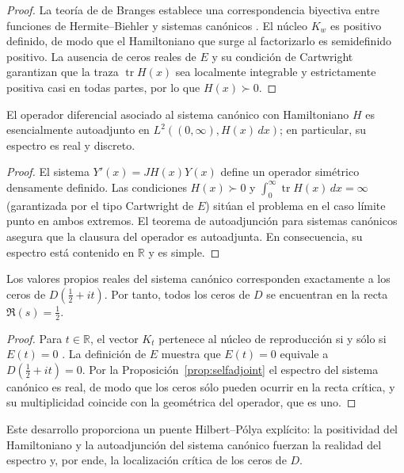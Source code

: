 \begin{proof}
La teoría de de Branges establece una correspondencia biyectiva entre funciones
de Hermite--Biehler y sistemas canónicos
\cite[Thm.~16]{deBranges1986}.  El núcleo $K_w$ es positivo definido, de modo que
el Hamiltoniano que surge al factorizarlo es semidefinido positivo.  La ausencia
de ceros reales de $E$ y su condición de Cartwright garantizan que la traza
$\operatorname{tr} H(x)$ sea localmente integrable y estrictamente positiva casi
en todas partes, por lo que $H(x)\succ 0$.
\end{proof}

\begin{proposition}[Autoadjunción]\label{prop:selfadjoint}
El operador diferencial asociado al sistema canónico con Hamiltoniano $H$ es
esencialmente autoadjunto en $L^2((0,\infty),H(x)\,dx)$; en particular, su
espectro es real y discreto.
\end{proposition}

\begin{proof}
El sistema $Y'(x)=JH(x)Y(x)$ define un operador simétrico densamente definido.
Las condiciones $H(x)\succ 0$ y
$\int_0^{\infty}\operatorname{tr} H(x)\,dx=\infty$ (garantizada por el tipo
Cartwright de $E$) sitúan el problema en el caso límite punto en ambos extremos.
El teorema de autoadjunción para sistemas canónicos
\cite[Thm.~35]{deBranges1986} asegura que la clausura del operador es
autoadjunta.  En consecuencia, su espectro está contenido en $\mathbb{R}$ y es
simple.
\end{proof}

\begin{theorem}\label{thm:zeros-critical-line}
Los valores propios reales del sistema canónico corresponden exactamente a los
ceros de $D\!\left(\tfrac{1}{2}+it\right)$.  Por tanto, todos los ceros de $D$ se
encuentran en la recta $\Re(s)=\tfrac{1}{2}$.
\end{theorem}

\begin{proof}
Para $t\in\mathbb{R}$, el vector $K_t$ pertenece al núcleo de reproducción si y
sólo si $E(t)=0$ \cite[Thm.~22]{deBranges1986}.  La definición de $E$ muestra que
$E(t)=0$ equivale a $D\!\left(\tfrac{1}{2}+it\right)=0$.  Por la
Proposición~\ref{prop:selfadjoint} el espectro del sistema canónico es real, de
modo que los ceros sólo pueden ocurrir en la recta crítica, y su multiplicidad
coincide con la geométrica del operador, que es uno.
\end{proof}

Este desarrollo proporciona un puente Hilbert--Pólya explícito: la positividad
del Hamiltoniano y la autoadjunción del sistema canónico fuerzan la realidad del
espectro y, por ende, la localización crítica de los ceros de $D$.
